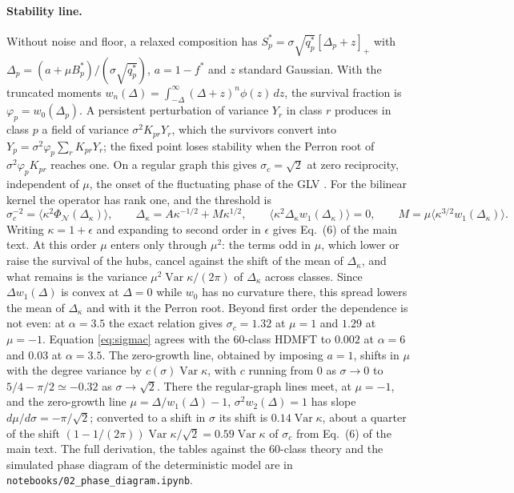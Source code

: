 \documentclass[pre,onecolumn,superscriptaddress,nofootinbib]{revtex4-2}
\newcommand{\Var}{\operatorname{Var}}
\newcommand{\PhiN}{\Phi_{\mathcal N}}
\begin{document}
\paragraph{Stability line.}  Without noise and floor, a relaxed composition has $S_p^*=\sigma\sqrt{q_p^*}
[\Delta_p+z]_+$ with $\Delta_p=(a+\mu B_p^*)/(\sigma\sqrt{q_p^*})$, $a=1-f^*$ and $z$ standard Gaussian.  With the
truncated moments $w_n(\Delta)=\int_{-\Delta}^\infty(\Delta+z)^n\phi(z)\,dz$, the survival fraction is
$\varphi_p=w_0(\Delta_p)$.  A persistent perturbation of variance $Y_r$ in class $r$ produces in class $p$ a
field of variance $\sigma^2K_{pr}Y_r$, which the survivors convert into $Y_p=\sigma^2\varphi_p\sum_rK_{pr}Y_r$; the
fixed point loses stability when the Perron root of $\sigma^2\varphi_pK_{pr}$ reaches one.  On a regular graph
this gives $\sigma_c=\sqrt2$ at zero reciprocity, independent of $\mu$, the onset of the fluctuating
phase of the GLV \cite{roy2020,mallmin2024}.  For the bilinear kernel the operator has rank one, and
the threshold is
\begin{equation}
\sigma_c^{-2}=\big\langle\kappa^2\PhiN(\Delta_\kappa)\big\rangle,\qquad \Delta_\kappa=A\kappa^{-1/2}+M\kappa^{1/2},\qquad
\big\langle\kappa^2\Delta_\kappa w_1(\Delta_\kappa)\big\rangle=0,\qquad M=\mu\big\langle\kappa^{3/2}w_1(\Delta_\kappa)\big\rangle .
\label{eq:sigmac}
\end{equation}
Writing $\kappa=1+\epsilon$ and expanding to second order in $\epsilon$ gives Eq.~(6) of the main text.  At this
order $\mu$ enters only through $\mu^2$: the terms odd in $\mu$, which lower or raise the survival of the hubs,
cancel against the shift of the mean of $\Delta_\kappa$, and what remains is the variance $\mu^2\Var\kappa/(2\pi)$ of
$\Delta_\kappa$ across classes.  Since $\Delta w_1(\Delta)$ is convex at $\Delta=0$ while $w_0$ has no curvature there,
this spread lowers the mean of $\Delta_\kappa$ and with it the Perron root.  Beyond first order the dependence is
not even: at $\alpha=3.5$ the exact relation gives $\sigma_c=1.32$ at $\mu=1$ and $1.29$ at $\mu=-1$.  Equation
\eqref{eq:sigmac} agrees with the 60-class HDMFT to $0.002$ at $\alpha=6$ and $0.03$ at $\alpha=3.5$.  The
zero-growth line, obtained by imposing $a=1$, shifts in $\mu$ with the degree variance by $c(\sigma)\Var\kappa$, with
$c$ running from $0$ as $\sigma\to0$ to $5/4-\pi/2\simeq-0.32$ as $\sigma\to\sqrt2$.  There the regular-graph lines meet, at
$\mu=-1$, and the zero-growth line $\mu=\Delta/w_1(\Delta)-1$, $\sigma^2w_2(\Delta)=1$ has slope $d\mu/d\sigma=-\pi/\sqrt2$; converted to a
shift in $\sigma$ its shift is $0.14\Var\kappa$, about a quarter of the shift $(1-1/(2\pi))\Var\kappa/\sqrt2=0.59\Var\kappa$
of $\sigma_c$ from Eq.~(6) of the main text.  The full
derivation, the tables against the 60-class theory and the simulated phase diagram of the
deterministic model are in \texttt{notebooks/02\_phase\_diagram.ipynb}.
\end{document}
